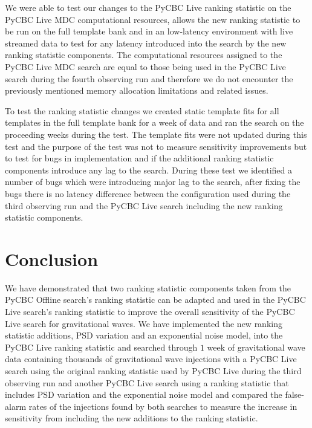 We were able to test our changes to the PyCBC Live ranking statistic on the PyCBC Live MDC computational resources, allows the new ranking statistic to be run on the full template bank and in an low-latency environment with live streamed data to test for any latency introduced into the search by the new ranking statistic components. The computational resources assigned to the PyCBC Live MDC search are equal to those being used in the PyCBC Live search during the fourth observing run and therefore we do not encounter the previously mentioned memory allocation limitations and related issues.

To test the ranking statistic changes we created static template fits for all templates in the full template bank for a week of data and ran the search on the proceeding weeks during the test. The template fits were not updated during this test and the purpose of the test was not to measure sensitivity improvements but to test for bugs in implementation and if the additional ranking statistic components introduce any lag to the search. During these test we identified a number of bugs which were introducing major lag to the search, after fixing the bugs there is no latency difference between the configuration used during the third observing run and the PyCBC Live search including the new ranking statistic components.
%
%





\section{\label{5:sec:conclusion}Conclusion}

We have demonstrated that two ranking statistic components taken from the PyCBC Offline search's ranking statistic can be adapted and used in the PyCBC Live search's ranking statistic to improve the overall sensitivity of the PyCBC Live search for gravitational waves. We have implemented the new ranking statistic additions, PSD variation and an exponential noise model, into the PyCBC Live ranking statistic and searched through $1$ week of gravitational wave data containing thousands of gravitational wave injections with a PyCBC Live search using the original ranking statistic used by PyCBC Live during the third observing run and another PyCBC Live search using a ranking statistic that includes PSD variation and the exponential noise model and compared the false-alarm rates of the injections found by both searches to measure the increase in sensitivity from including the new additions to the ranking statistic. 

